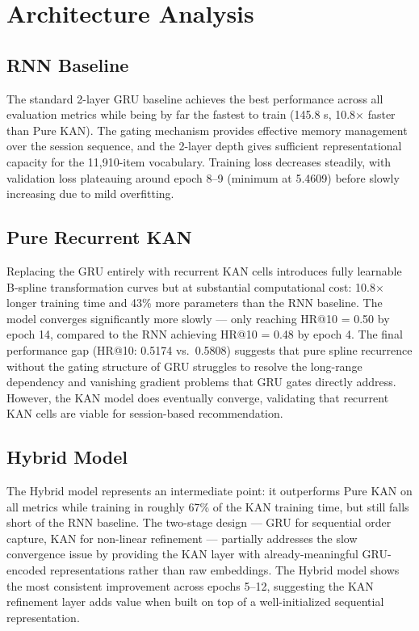 \documentclass[12pt,a4paper]{report}
\begin{document}
\section{Architecture Analysis}

\subsection{RNN Baseline}

The standard 2-layer GRU baseline achieves the best performance across all
evaluation metrics while being by far the fastest to train (145.8 s, 10.8$\times$
faster than Pure KAN). The gating mechanism provides effective memory management
over the session sequence, and the 2-layer depth gives sufficient representational
capacity for the 11,910-item vocabulary. Training loss decreases steadily, with
validation loss plateauing around epoch 8--9 (minimum at 5.4609) before slowly
increasing due to mild overfitting.

\subsection{Pure Recurrent KAN}

Replacing the GRU entirely with recurrent KAN cells introduces fully learnable
B-spline transformation curves but at substantial computational cost:
10.8$\times$ longer training time and 43\% more parameters than the RNN baseline.
The model converges significantly more slowly --- only reaching HR@10 = 0.50 by
epoch 14, compared to the RNN achieving HR@10 = 0.48 by epoch 4. The final
performance gap (HR@10: 0.5174 vs.\ 0.5808) suggests that pure spline recurrence
without the gating structure of GRU struggles to resolve the long-range dependency
and vanishing gradient problems that GRU gates directly address. However, the KAN
model does eventually converge, validating that recurrent KAN cells are viable
for session-based recommendation.

\subsection{Hybrid Model}

The Hybrid model represents an intermediate point: it outperforms Pure KAN on all
metrics while training in roughly 67\% of the KAN training time, but still falls
short of the RNN baseline. The two-stage design --- GRU for sequential order
capture, KAN for non-linear refinement --- partially addresses the slow convergence
issue by providing the KAN layer with already-meaningful GRU-encoded representations
rather than raw embeddings. The Hybrid model shows the most consistent improvement
across epochs 5--12, suggesting the KAN refinement layer adds value when built on
top of a well-initialized sequential representation.
\end{document}
